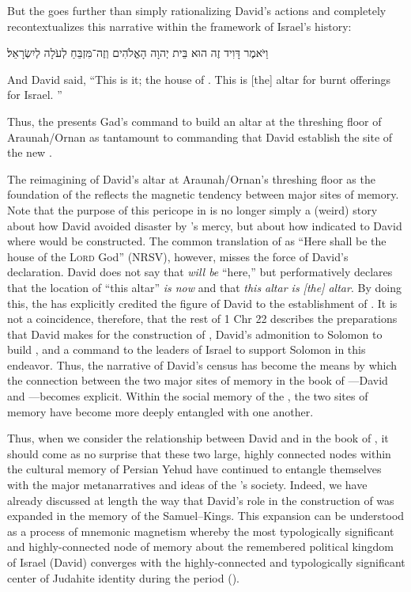 But the \chronicler goes further than simply rationalizing David's actions and completely recontextualizes this narrative within the framework of Israel's history:
\begin{hebrewtext}
    וַיֹּאמֶר דָּוִיד זֶה הוּא בֵּית יְהוָה הָאֱלֹהִים וְזֶה־מִּזְבֵּחַ לְעֹלָה לְיִשְׂרָאֵל׃ 
\end{hebrewtext}
\begin{translation}
    And David said, ``This is it; the house of \yahweh. This is [the] altar for burnt offerings for Israel. ''
\end{translation}
\noindent
Thus, the \chronicler presents Gad's command to build an altar at the threshing floor of Araunah/Ornan as tantamount to commanding that David establish the site of the new \temple.  

The reimagining of David's altar at Araunah/Ornan's threshing floor as the foundation of the \jerusalemtemple reflects the magnetic tendency between major sites of memory. Note that the purpose of this pericope in \chronicles is no longer simply a (weird) story about how David avoided disaster by \yahweh's mercy, but about how \yahweh indicated to David where \thetemple would be constructed. The common translation of  as ``Here shall be the house of the \textsc{Lord} God'' (NRSV), however, misses the force of David's declaration. David does not say that \thetemple \emph{will be} ``here,'' but performatively declares that the location of ``this altar'' \emph{is now \thetemple} and that \emph{this altar is [the] altar}.%
    \autocite[31--36]{najman2003}
By doing this, the \chronicler has explicitly credited the figure of David to the establishment of \solomonstemple. It is not a coincidence, therefore, that the rest of 1 Chr 22 describes the preparations that David makes for the construction of \thetemple, David's admonition to Solomon to build \thetemple, and a command to the leaders of Israel to support Solomon in this endeavor. Thus, the narrative of David's census has become the means by which the connection between the two major sites of memory in the book of \chronicles---David and \thetemple---becomes explicit. Within the social memory of the \chronicler, the two sites of memory have become more deeply entangled with one another. 

Thus, when we consider the relationship between David and \thetemple in the book of \chronicles, it should come as no surprise that these two large, highly connected nodes within the cultural memory of Persian Yehud have continued to entangle themselves with the major metanarratives and ideas of the \chronicler's society. Indeed, we have already discussed at length the way that David's role in the construction of \thetemple was expanded in the memory of the \chronicler \visavis Samuel--Kings. This expansion can be understood as a process of mnemonic magnetism whereby the most typologically significant and highly-connected node of memory about the remembered political kingdom of Israel (David) converges with the highly-connected and typologically significant center of Judahite identity during the \secondtemple period (\thetemple). 

